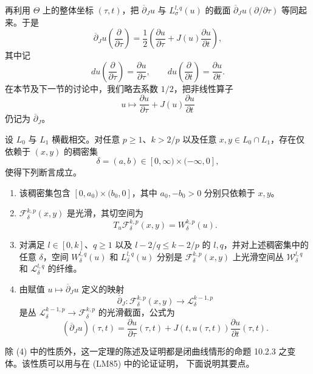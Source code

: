 再利用 $\Theta$ 上的整体坐标 $(\tau,t)$，把 $\overline\partial_Ju$ 与
$L_\sigma^{l,q}(u)$ 的截面
$\overline\partial_Ju(\partial/\partial\tau)$ 等同起来。于是
\[
 \overline\partial_Ju\left(\frac\partial{\partial\tau}\right)
 =\frac12\left(\frac{\partial u}{\partial\tau}
 +J(u)\frac{\partial u}{\partial t}\right),
\]
其中记
\[
 du\left(\frac\partial{\partial\tau}\right)=\frac{\partial u}{\partial\tau},
 \qquad
 du\left(\frac\partial{\partial t}\right)=\frac{\partial u}{\partial t}.
\]
在本节及下一节的讨论中，我们略去系数 $1/2$，把非线性算子
\[
 u\longmapsto\frac{\partial u}{\partial\tau}+J(u)\frac{\partial u}{\partial t}
\]
仍记为 $\overline\partial_J$。

\begin{theorem}
\label{thm:weighted-off-shell-banach-framework}
设 $L_0$ 与 $L_1$ 横截相交。对任意 $p\geq1$、$k>2/p$ 以及任意
$x,y\in L_0\cap L_1$，存在仅依赖于 $(x,y)$ 的稠密集
\[
 \delta=(a,b)\in[0,\infty)\times(-\infty,0],
\]
使得下列断言成立。
\begin{enumerate}[label=(\arabic*)]
\item 该稠密集包含 $[0,a_0)\times(b_0,0]$，其中
$a_0,-b_0>0$ 分别只依赖于 $x,y$。
\item $\mathcal F_\delta^{k,p}(x,y)$ 是光滑\termBanachManifold{}，其切空间为
\[
 T_u\mathcal F_\delta^{k,p}(x,y)=W_\delta^{k,p}(u).
\]
\item 对满足 $l\in[0,k]$、$q\geq1$ 以及
$l-2/q\leq k-2/p$ 的 $l,q$，并对上述稠密集中的任意 $\delta$，\personBanach{}空间 $W_\delta^{l,q}(u)$ 和 $L_\delta^{l,q}(u)$ 分别是
$\mathcal F_\delta^{k,p}(x,y)$ 上光滑\personBanach{}空间丛
$\mathcal W_\delta^{l,q}$ 和 $\mathcal L_\delta^{l,q}$ 的纤维。
\item 由赋值 $u\mapsto\overline\partial_Ju$ 定义的映射
\[
 \overline\partial_J:\mathcal F_\delta^{k,p}(x,y)
 \longrightarrow\mathcal L_\delta^{k-1,p}
\]
是\personBanach{}丛 $\mathcal L_\delta^{k-1,p}\to\mathcal F_\delta^{k,p}$ 的光滑\personFredholm{}截面，公式为
\[
 (\overline\partial_Ju)(\tau,t)
 =\frac{\partial u}{\partial\tau}(\tau,t)
 +J(t,u(\tau,t))\frac{\partial u}{\partial t}(\tau,t).
\]
\end{enumerate}
\end{theorem}

除 (4) 中的\personFredholm{}性质外，这一定理的陈述及证明都是闭曲线情形的命题 10.2.3
之变体。该\personFredholm{}性质可以用\personRobertLockhart{}与\personRobertMcOwen{}在 (LM85) 中的论证证明，
下面说明其要点。

